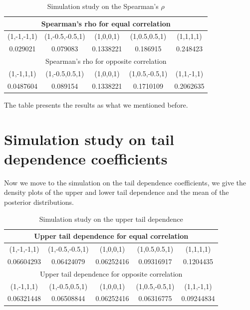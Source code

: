 \documentclass[mstat,12pt]{unswthesis}  %
\numberwithin{equation}{section}
\begin{document}
\begin{table}[]
\centering
\begin{tabular}{|c|c|c|c|c|}
\hline
\multicolumn{5}{|c|}{Spearman's rho for equal correlation}              \\ \hline
(1,-1,-1,1) & (1,-0.5,-0.5,1) & (1,0,0,1) & (1,0.5,0.5,1)  & (1,1,1,1)  \\ \hline
0.029021    & 0.079083        & 0.1338221 & 0.186915       & 0.248423   \\ \hline
\multicolumn{5}{|c|}{Spearman's rho for opposite correlation}           \\ \hline
(1,-1,1,1)  & (1,-0.5,0.5,1)  & (1,0,0,1) & (1,0.5,-0.5,1) & (1,1,-1,1) \\ \hline
0.0487604   & 0.089154        & 0.1338221 & 0.1710109      & 0.2062635  \\ \hline
\end{tabular}
\caption{Simulation study on the Spearman's $\rho$ }
\label{tab:my-table}
\end{table}
The table presents the results as what we mentioned before.

\newpage

\section{Simulation study on tail dependence coefficients}
Now we move to the simulation on the tail dependence coefficients, we give the density plots of the upper and lower tail dependence and the mean of the posterior distributions.

\begin{table}[H]
\centering
\begin{tabular}{|c|c|c|c|c|}
\hline
\multicolumn{5}{|c|}{Upper tail dependence for equal correlation}        \\ \hline
(1,-1,-1,1) & (1,-0.5,-0.5,1) & (1,0,0,1)  & (1,0.5,0.5,1)  & (1,1,1,1)  \\ \hline
0.06604293  & 0.06424079      & 0.06252416 & 0.09316917     & 0.1204435  \\ \hline
\multicolumn{5}{|c|}{Upper tail dependence for opposite correlation}     \\ \hline
(1,-1,1,1)  & (1,-0.5,0.5,1)  & (1,0,0,1)  & (1,0.5,-0.5,1) & (1,1,-1,1) \\ \hline
0.06321448  & 0.06508844      & 0.06252416 & 0.06316775     & 0.09244834 \\ \hline
\end{tabular}
\caption{Simulation study on the upper tail dependence }
\label{tab:my-table}
\end{table}
\end{document}
